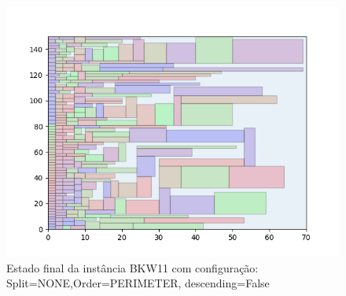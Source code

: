 \begin{figure}[H]
    \centering
    \caption[]{Estado final da instância BKW11 com configuração: Split=NONE,Order=PERIMETER, descending=False}
    \label{fig:bkw11-none-perimeter-false}
    \includegraphics[scale=0.5]{output/figures/bkw/bkw11/none/perimeter/false/000}
\end{figure}